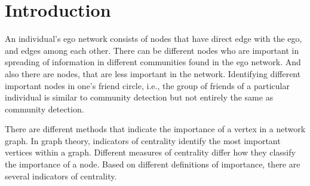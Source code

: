 \section{Introduction}
\label{intro}

An individual's ego network consists of nodes that have direct edge
with the ego, and edges among each other.  There can be different
nodes who are important in spreading of information in different
communities found in the ego network.  And also there are nodes, that
are less important in the network.  Identifying different important
nodes in one’s friend circle, i.e., the group of friends of a
particular individual is similar to community detection but not
entirely the same as community detection.

There are different methods that indicate the importance of a vertex
in a network graph.  In graph theory, indicators of centrality
identify the most important vertices within a graph.  Different
measures of centrality differ how they classify the importance of a
node.  Based on different definitions of importance, there are several
indicators of centrality.
